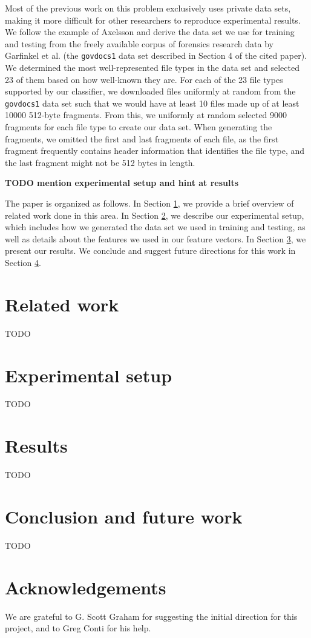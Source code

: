 \documentclass[letter,11pt]{article}
\begin{document}
Most of the previous work on this problem exclusively uses private data sets, making it more difficult for other researchers to reproduce experimental results. We follow the example of Axelsson \cite{Axelsson10} and derive the data set we use for training and testing from the freely available corpus of forensics research data by Garfinkel et al. \cite{Garfinkel09} (the \texttt{govdocs1} data set described in Section 4 of the cited paper). We determined the most well-represented file types in the data set and selected 23 of them based on how well-known they are. For each of the 23 file types supported by our classifier, we downloaded files uniformly at random from the \texttt{govdocs1} data set such that we would have at least 10 files made up of at least 10000 512-byte fragments. From this, we uniformly at random selected 9000 fragments for each file type to create our data set. When generating the fragments, we omitted the first and last fragments of each file, as the first fragment frequently contains header information that identifies the file type, and the last fragment might not be 512 bytes in length.

\textbf{TODO mention experimental setup and hint at results}

The paper is organized as follows. In Section \ref{Section:RelatedWork}, we provide a brief overview of related work done in this area. In Section \ref{Section:ExperimentalSetup}, we describe our experimental setup, which includes how we generated the data set we used in training and testing, as well as details about the features we used in our feature vectors. In Section \ref{Section:Results}, we present our results. We conclude and suggest future directions for this work in Section \ref{Section:ConclusionAndFutureWork}.

\section{Related work}
\label{Section:RelatedWork}
TODO \cite{Conti10, Garfinkel09, Axelsson10, Calhoun08, Li10, Veenman07}

\section{Experimental setup}
\label{Section:ExperimentalSetup}
TODO

\section{Results}
\label{Section:Results}
TODO

\section{Conclusion and future work}
\label{Section:ConclusionAndFutureWork}
TODO

\section*{Acknowledgements}
We are grateful to G. Scott Graham for suggesting the initial direction for this project, and to Greg Conti for his help.


\newpage


\end{document}
